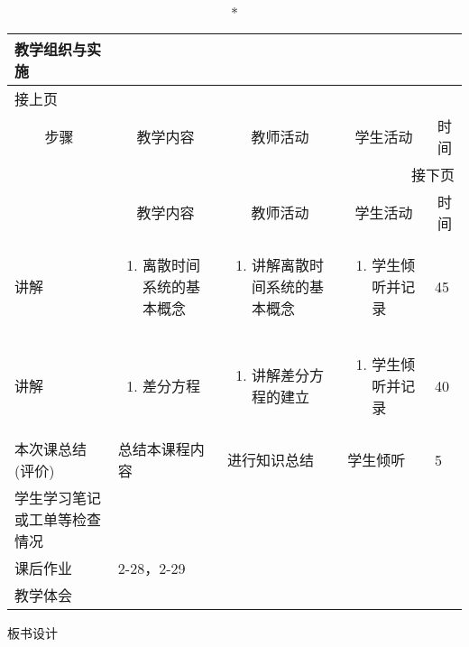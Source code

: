 {%
\begin{landscape}

\begin{longtable}{|m{10mm}|m{50mm}|m{50mm}|m{50mm}|m{15mm}|}
\caption*{\huge 教学组织与实施}\\
\hline
\endfirsthead
\multicolumn{5}{l}{\small 接上页}\\
\hline
\multicolumn{1}{|c|}{步骤}&\multicolumn{1}{c|}{教学内容}&\multicolumn{1}{c|}{教师活动}&\multicolumn{1}{c|}{学生活动}&\multicolumn{1}{c|}{时间}\\
\hline
\endhead

\multicolumn{5}{r}{\small 接下页}\\
\endfoot
\hline
\endlastfoot
\multicolumn{1}{|c|}{步骤}&\multicolumn{1}{c|}{教学内容}&\multicolumn{1}{c|}{教师活动}&\multicolumn{1}{c|}{学生活动}&\multicolumn{1}{c|}{时间}\\\hline
讲解&\begin{enumerate}
\item 离散时间系统的基本概念
\end{enumerate} &\begin{enumerate}
\item 讲解离散时间系统的基本概念
\end{enumerate} &\begin{enumerate}
\item 学生倾听并记录
\end{enumerate} &45\\\hline
讲解&\begin{enumerate}
\item 差分方程
\end{enumerate}
 &\begin{enumerate}
\item 讲解差分方程的建立
\end{enumerate} &\begin{enumerate}
\item 学生倾听并记录
\end{enumerate} &40 \\\hline

\centering 本次课总结(评价)&总结本课程内容 &进行知识总结 &学生倾听 &5 \\\hline
\centering 学生学习笔记或工单等检查情况&\multicolumn{4}{m{165mm}|}{\quad}\\\hline
\centering 课后作业&\multicolumn{4}{m{165mm}|}{2-28，2-29}\\\hline
\centering 教学体会&\multicolumn{4}{m{165mm}|}{\quad}\\
\end{longtable}

\end{landscape}
\clearpage
\begin{center}
{\huge 板书设计}
\end{center}
}

